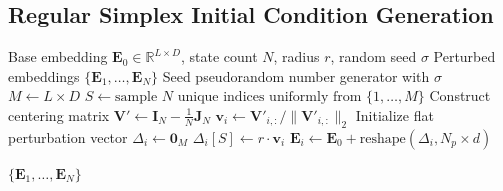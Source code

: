 \documentclass[a4paper,12pt]{article}
\begin{document}
    \subsection{Regular Simplex Initial Condition Generation} 
    \label{alg:simplex_perturbation}

    \begin{algorithm}[H]
    \caption{Regular Simplex Initial Condition Generation}
    \begin{algorithmic}[1]
    \REQUIRE Base embedding $\mathbf{E}_0 \in \mathbb{R}^{L \times D}$, state count $N$, radius $r$, random seed $\sigma$
    \ENSURE Perturbed embeddings $\{\mathbf{E}_1, \dots, \mathbf{E}_N\}$
    \STATE Seed pseudorandom number generator with $\sigma$
    \STATE $M \leftarrow L \times D$
    \STATE $S \leftarrow \text{sample } N \text{ unique indices uniformly from } \{1, \dots, M\}$
    \STATE Construct centering matrix $\mathbf{V}' \leftarrow \mathbf{I}_N - \frac{1}{N}\mathbf{J}_N$ 
        \STATE $\mathbf{v}_i \leftarrow \mathbf{V}'_{i, :} / \|\mathbf{V}'_{i, :}\|_2$ 
    \ENDFOR
        \STATE Initialize flat perturbation vector $\Delta_i \leftarrow \mathbf{0}_M$
        \STATE $\Delta_i[S] \leftarrow r \cdot \mathbf{v}_i$ 
        \STATE $\mathbf{E}_i \leftarrow \mathbf{E}_0 + \text{reshape}(\Delta_i, N_p \times d)$
    \ENDFOR

    \RETURN $\{\mathbf{E}_1, \dots, \mathbf{E}_N\}$
    \end{algorithmic}
    \end{algorithm}


    
\end{document}
